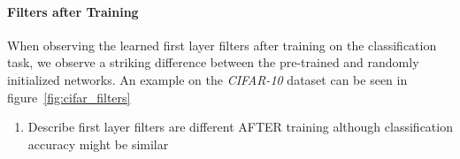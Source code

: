 \documentclass[draft]{article}
\begin{document}
      \paragraph{Filters after Training}

      When observing the learned first layer filters after training on the classification task, we observe a striking difference between the pre-trained and randomly initialized networks. An example on the \emph{CIFAR-10} dataset can be seen in figure~\ref{fig:cifar_filters}

        \begin{enumerate}
          
          \item{Describe first layer filters are different AFTER training although classification accuracy might be similar}
        \end{enumerate}
\end{document}

